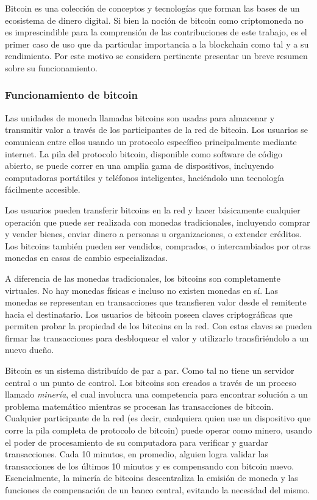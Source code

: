Bitcoin es una colección de conceptos y tecnologías que forman las bases de un ecosistema de dinero
digital. Si bien la noción de bitcoin como criptomoneda no es imprescindible para la comprensión de las
contribuciones de este trabajo, es el primer caso de uso que da particular importancia a la blockchain
como tal y a su rendimiento. Por este motivo se considera pertinente presentar un breve resumen sobre
su funcionamiento.

\subsubsection{Funcionamiento de bitcoin}

Las unidades de moneda llamadas bitcoins son usadas para almacenar y transmitir valor a través
de los participantes de la red de bitcoin. Los usuarios se comunican entre ellos usando un protocolo 
específico principalmente mediante internet. La pila del
protocolo bitcoin, disponible como software de código abierto, se puede correr en una amplia gama de
dispositivos, incluyendo computadoras portátiles y teléfonos inteligentes, haciéndolo una tecnología
fácilmente accesible.

Los usuarios pueden transferir bitcoins en la red y hacer básicamente cualquier operación que puede ser
realizada con monedas tradicionales, incluyendo comprar y vender bienes, enviar dinero a personas u
organizaciones, o extender créditos. Los bitcoins también pueden ser vendidos, comprados, o intercambiados por
otras monedas en casas de cambio especializadas.

A diferencia de las monedas tradicionales, los bitcoins son completamente virtuales. No hay monedas
físicas e incluso no existen monedas en sí. Las monedas se representan en transacciones que transfieren
valor desde el remitente hacia el destinatario. Los usuarios de bitcoin poseen claves criptográficas
que permiten probar la propiedad de los bitcoins en la red. Con estas claves se pueden firmar las
transacciones para desbloquear el valor y utilizarlo transfiriéndolo a un nuevo dueño. 

Bitcoin es un sistema distribuído de par a par. Como tal no tiene un servidor central o un punto de control.
Los bitcoins son creados a través de un proceso llamado \textit{minería}, el cual involucra una competencia
para encontrar solución a un problema matemático mientras se procesan las transacciones de bitcoin.
Cualquier participante de la red (es decir, cualquiera quien use un dispositivo que corre la pila
completa de protocolo de bitcoin) puede operar como minero, usando el poder de procesamiento de su
computadora para verificar y guardar transacciones. Cada 10 minutos, en promedio, alguien logra validar
las transacciones de los últimos 10 minutos y es compensando con bitcoin nuevo. Esencialmente, la minería
de bitcoins descentraliza la emisión de moneda y las funciones de compensación de un banco central, evitando
la necesidad del mismo.

